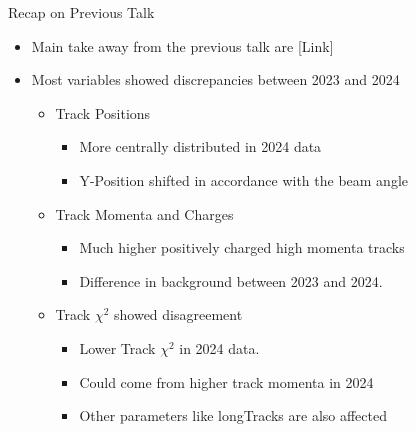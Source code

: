 \begin{frame}{Recap on Previous Talk}
    \begin{itemize}
        \small
        \item Main take away from the previous talk are [Link]
        \item Most variables showed discrepancies between 2023 and 2024
        \begin{itemize}
            \item Track Positions
            \begin{itemize}
                \item More centrally distributed in 2024 data
                \item Y-Position shifted in accordance with the beam angle
            \end{itemize}
            \item Track Momenta and Charges
            \begin{itemize}
                \item Much higher positively charged high momenta tracks
                \item Difference in background between 2023 and 2024.
            \end{itemize}
            \item Track $\chi^2$ showed disagreement
            \begin{itemize}
                \item Lower Track $\chi^2$ in 2024 data.
                \item Could come from higher track momenta in 2024
                \item Other parameters like longTracks are also affected
            \end{itemize}
        \end{itemize}
    \end{itemize}    
\end{frame}


